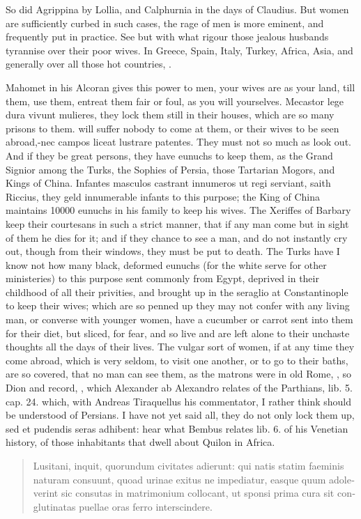 So did Agrippina by Lollia, and Calphurnia in the days of Claudius. But
women are sufficiently curbed in such cases, the rage of men is more
eminent, and frequently put in practice. See but with what rigour those
jealous husbands tyrannise over their poor wives. In Greece, Spain,
Italy, Turkey, Africa, Asia, and generally over all those hot
countries, .

Mahomet in his Alcoran gives this power to men, your wives are as your
land, till them, use them, entreat them fair or foul, as you will
yourselves. Mecastor lege dura vivunt mulieres, they lock them
still in their houses, which are so many prisons to them. will suffer
nobody to come at them, or their wives to be seen abroad,-nec campos
liceat lustrare patentes. They must not so much as look out. And if
they be great persons, they have eunuchs to keep them, as the Grand
Signior among the Turks, the Sophies of Persia, those Tartarian Mogors,
and Kings of China. Infantes masculos castrant innumeros ut regi
serviant, saith Riccius, they geld innumerable infants to this
purpose; the King of China maintains 10\thinspace{}000 eunuchs in his family
to keep his wives. The Xeriffes of Barbary keep their courtesans in
such a strict manner, that if any man come but in sight of them he dies
for it; and if they chance to see a man, and do not instantly cry out,
though from their windows, they must be put to death. The Turks have I
know not how many black, deformed eunuchs (for the white serve for
other ministeries) to this purpose sent commonly from Egypt, deprived
in their childhood of all their privities, and brought up in the
seraglio at Constantinople to keep their wives; which are so penned up
they may not confer with any living man, or converse with younger
women, have a cucumber or carrot sent into them for their diet, but
sliced, for fear, \etc{} and so live and are left alone to their unchaste
thoughts all the days of their lives. The vulgar sort of women, if at
any time they come abroad, which is very seldom, to visit one another,
or to go to their baths, are so covered, that no man can see them, as
the matrons were in old Rome, , so
Dion and \Seneca record, , which
Alexander ab Alexandro relates of the Parthians, lib. 5. cap. 24.
which, with Andreas Tiraquellus his commentator, I rather think should
be understood of Persians. I have not yet said all, they do not only
lock them up, sed et pudendis seras adhibent: hear what Bembus relates
lib. 6. of his Venetian history, of those inhabitants that dwell about
Quilon in Africa.
%
\begin{latin}%
\begin{quote}%
Lusitani, inquit, quorundum civitates adierunt: qui
natis statim faeminis naturam consuunt, quoad urinae exitus ne
impediatur, easque quum adoleverint sic consutas in matrimonium
collocant, ut sponsi prima cura sit conglutinatas puellae oras ferro
interscindere.
\end{quote}%
\end{latin}%

